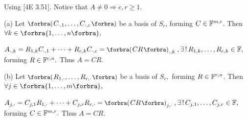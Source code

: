Using [4E 3.51]. Notice that $A\neq 0\Rightarrow c,r\geqslant 1.$\vspace{2pt}\par\quad
(a) Let $\BigPar{C_{\cdot,1},\dots,C_{\cdot,c}}$ be a basis of $S_c$, forming $C\in{\mathbb{F}}^{m,c}$. Then $\forall k\in\Bra{1,\dots,n},$\vspace{2pt}\par\quad\Ha
$A_{\cdot,k}=R_{1,k}C_{\cdot,1}+\dots+R_{c,k}C_{\cdot,c}=\BigPar{CR}_{\cdot,k}\;,\exists\,!\,R_{1,k},\dots,R_{c,k}\in\Fbb,$ forming $R\in{\mathbb{F}}^{c,n}.$ Thus $A=CR.$\vspace{4pt}\par\quad
(b) Let $\BigPar{R_{1,\cdot},\dots,R_{r,\cdot}}$ be a basis of $S_r,$ forming $R\in{\mathbb{F}}^{r,n}$. Then $\forall j\in\Bra{1,\dots,m},$\vspace{2pt}\par\quad\Hb
$A_{j,\cdot}=C_{j,1}R_{1,\cdot}+\dots+C_{j,r}R_{r,\cdot}=\BigPar{CR}_{j,\cdot}\;,\exists\,!\,C_{j,1},\dots,C_{j,r}\in\Fbb,$ forming $C\in{\mathbb{F}}^{m,r}.$ Thus $A=CR.$\PfEnd\vspace{6pt}
